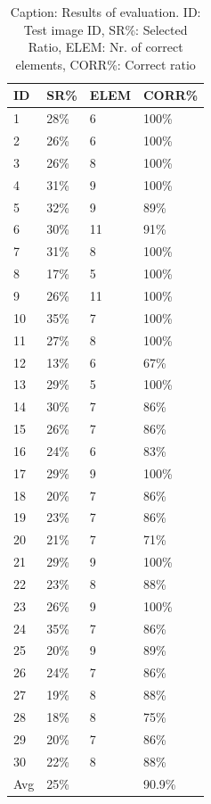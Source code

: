 \documentclass[10pt,twocolumn,letterpaper]{article}
\begin{document}
\begin{table}[H]
\centering
\begin{tabular}{l|l|l|l} \hline
		ID & SR\% & ELEM & CORR\% \\ \hline \hline
		1&28\%&6&100\%\\ \hline
		2&26\%&6&100\%\\ \hline
		3&26\%&8&100\%\\ \hline
		4&31\%&9&100\%\\ \hline
		5&32\%&9&89\%\\ \hline
		6&30\%&11&91\%\\ \hline
		7&31\%&8&100\%\\ \hline
		8&17\%&5&100\%\\ \hline
		9&26\%&11&100\%\\ \hline
		10&35\%&7&100\%\\ \hline
		11&27\%&8&100\%\\ \hline
		12&13\%&6&67\%\\ \hline
		13&29\%&5&100\%\\ \hline
		14&30\%&7&86\%\\ \hline
		15&26\%&7&86\%\\ \hline
		16&24\%&6&83\%\\ \hline
		17&29\%&9&100\%\\ \hline
		18&20\%&7&86\%\\ \hline
		19&23\%&7&86\%\\ \hline
		20&21\%&7&71\%\\ \hline
		21&29\%&9&100\%\\ \hline
		22&23\%&8&88\%\\ \hline
		23&26\%&9&100\%\\ \hline
		24&35\%&7&86\%\\ \hline
		25&20\%&9&89\%\\ \hline
		26&24\%&7&86\%\\ \hline
		27&19\%&8&88\%\\ \hline
		28&18\%&8&75\%\\ \hline
		29&20\%&7&86\%\\ \hline
		30&22\%&8&88\%\\ \hline \hline
		Avg & 25\% & & 90.9\%\\ \hline
\end{tabular}
\caption{Caption: Results of evaluation. ID: Test image ID, SR\%: Selected Ratio, ELEM: Nr. of correct elements, CORR\%: Correct ratio}
\label{tab:det2}
\end{table}
\par
\end{document}
